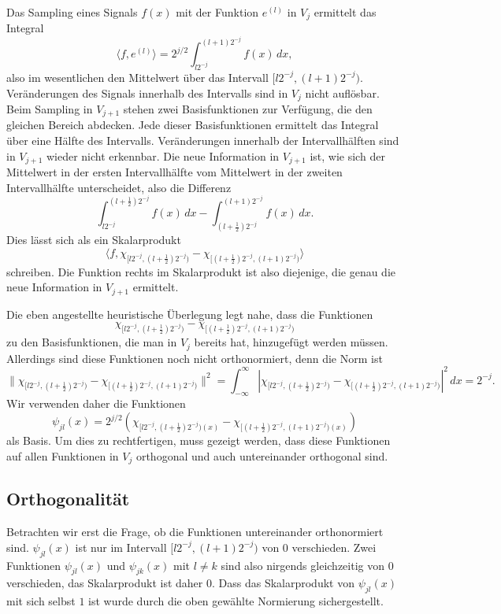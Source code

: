 Das Sampling eines Signals $f(x)$ mit der Funktion $e^{(l)}$ in $V_j$
ermittelt das Integral
\[
\langle f,e^{(l)}\rangle
=
2^{j/2}
\int_{l2^{-j}}^{(l+1)2^{-j}} f(x)\,dx,
\]
also im wesentlichen den Mittelwert über das Intervall $[l2^{-j},(l+1)2^{-j})$.
Veränderungen des Signals innerhalb des Intervalls sind in $V_j$ nicht
auflösbar.
Beim Sampling in $V_{j+1}$ stehen zwei Basisfunktionen zur Verfügung, die
den gleichen Bereich abdecken.
Jede dieser Basisfunktionen ermittelt das Integral über eine Hälfte des
Intervalls.
Veränderungen innerhalb der Intervallhälften sind in $V_{j+1}$ wieder nicht
erkennbar.
Die neue Information in $V_{j+1}$ ist, wie sich der Mittelwert
in der ersten Intervallhälfte vom Mittelwert in der zweiten Intervallhälfte
unterscheidet, also die Differenz
\[
\int_{l2^{-j}}^{(l+\frac12)2^{-j}} f(x)\,dx
-
\int_{(l+\frac12)2^{-j}}^{(l+1)2^{-j}} f(x)\,dx.
\]
Dies lässt sich als ein Skalarprodukt
\[
\langle f,
\chi_{[l2^{-j},(l+\frac12)2^{-j})}
-
\chi_{[(l+\frac12)2^{-j},(l+1)2^{-j})}
\rangle
\]
schreiben.
Die Funktion rechts im Skalarprodukt ist also diejenige, die genau die
neue Information in $V_{j+1}$ ermittelt.

Die eben angestellte heuristische Überlegung legt nahe, dass die Funktionen
\begin{equation}
\chi_{[l2^{-j},(l+\frac12)2^{-j})}
-
\chi_{[(l+\frac12)2^{-j},(l+1)2^{-j})}
\end{equation}
zu den Basisfunktionen, die man in $V_j$ bereits hat, hinzugefügt werden
müssen.
Allerdings sind diese Funktionen noch nicht orthonormiert, denn die
Norm ist
\[
\|
\chi_{[l2^{-j},(l+\frac12)2^{-j})}
-
\chi_{[(l+\frac12)2^{-j},(l+1)2^{-j})}
\|^2
=
\int_{-\infty}^\infty
|
\chi_{[l2^{-j},(l+\frac12)2^{-j})}
-
\chi_{[(l+\frac12)2^{-j},(l+1)2^{-j})}
|^2
\,dx
=
2^{-j}.
\]
Wir verwenden daher die Funktionen
\[
\psi_{jl}(x) = 2^{j/2}(
\chi_{[l2^{-j},(l+\frac12)2^{-j})(x)}
-
\chi_{[(l+\frac12)2^{-j},(l+1)2^{-j})(x)}
)
\]
als Basis.
Um dies zu rechtfertigen, muss gezeigt werden, dass diese Funktionen auf
allen Funktionen in $V_j$ orthogonal und auch untereinander orthogonal
sind.

\subsection{Orthogonalität}
Betrachten wir erst die Frage, ob die Funktionen untereinander orthonormiert
sind.
$\psi_{jl}(x)$ ist nur im Intervall $[l2^{-j},(l+1)2^{-j})$ von $0$
verschieden.
Zwei Funktionen $\psi_{jl}(x)$ und $\psi_{jk}(x)$ mit $l\ne k$ sind
also nirgends gleichzeitig von $0$ verschieden, das Skalarprodukt ist
daher $0$.
Dass das Skalarprodukt von $\psi_{jl}(x)$ mit sich selbst $1$ ist wurde
durch die oben gewählte Normierung sichergestellt.

